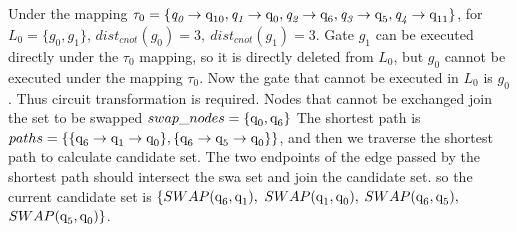\documentclass[runningheads]{llncs}
\begin{document}
\begin{example}
	Under the mapping $\tau_{0}=\{\textit{q}_\textit{0}\rightarrow  \textup{q}_{\textup{10}},\textit{q}_\textit{1}\rightarrow \textup{q}_{\textup{0}},
\textit{q}_\textit{2}\rightarrow  \textup{q}_{\textup{6}},\textit{q}_\textit{3}\rightarrow  \textup{q}_{\textup{5}},\textit{q}_\textit{4}\rightarrow  \textup{q}_{\textup{11}}\}$, 
for $L_{0}=\{g_{0},g_{1}\}$, $dist_{cnot}(g_{0})=3,\ dist_{cnot}(g_{1})=3$. 
Gate $g_{1}$ can be executed directly under the $\tau_{0}$ mapping, so it is directly deleted from $L_{0}$,
but $g_{0}$ cannot be executed under the mapping $\tau_{0}$. 
Now the gate that cannot be executed in $L_{0}$ is $g_{0}$. 
Thus circuit transformation is required. 
Nodes that cannot be exchanged join the set to be swapped $swap\_nodes=\{\textup{q}_{\textup{0}},\textup{q}_\textup{6}\}$
The shortest path is $paths=\{\{\textup{q}_{\textup{6}}\rightarrow \textup{q}_{\textup{1}} \rightarrow \textup{q}_{0} \},\{\textup{q}_\textup{6}\rightarrow \textup{q}_\textup{5} \rightarrow \textup{q}_\textup{0} \}\}$, 
and then we traverse the shortest path to calculate candidate set.
The two endpoints of the edge passed by the shortest path should intersect the swa set and join the candidate set.
so the current candidate set is $\{SWAP(\textup{q}_\textup{6},\textup{q}_\textup{1}),$ $SWAP(\textup{q}_\textup{1},\textup{q}_\textup{0}),$ $SWAP(\textup{q}_\textup{6},\textup{q}_\textup{5}),$ $SWAP(\textup{q}_\textup{5},\textup{q}_\textup{0}) \}$.
\end{example}
\end{document}
